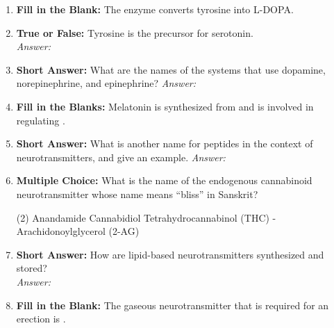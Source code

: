 \begin{enumerate}[label=\textbf{Q3.3.\arabic*}]
    \item \textbf{Fill in the Blank:} The enzyme \underline{\hspace{3cm}} converts tyrosine into L-DOPA.

    \item \textbf{True or False:} Tyrosine is the precursor for serotonin. \\
        \textit{Answer:} %

    \item \textbf{Short Answer:} What are the names of the systems that use dopamine, norepinephrine, and epinephrine?  
        \textit{Answer:} %

    \item \textbf{Fill in the Blanks:} Melatonin is synthesized from \underline{\hspace{3cm}} and is involved in regulating \underline{\hspace{3cm}}.

    \item \textbf{Short Answer:} What is another name for peptides in the context of neurotransmitters, and give an example.  
        \textit{Answer:} %

    \item \textbf{Multiple Choice:} What is the name of the endogenous cannabinoid neurotransmitter whose name means ``bliss'' in Sanskrit?
        \begin{tasks}[label=\textcolor{\documentTheme}{(\Alph*)}, item-format=\color{\documentTheme}, label-width=1.5em, item-indent=1.7em](2)
            \task Anandamide
            \task Cannabidiol
            \task Tetrahydrocannabinol (THC)
            -Arachidonoylglycerol (2-AG)
        \end{tasks}

    \item \textbf{Short Answer:} How are lipid-based neurotransmitters synthesized and stored? \\
        \textit{Answer:} %

    \item \textbf{Fill in the Blank:} The gaseous neurotransmitter that is required for an erection is \underline{\hspace{3cm}}.


\end{enumerate}
